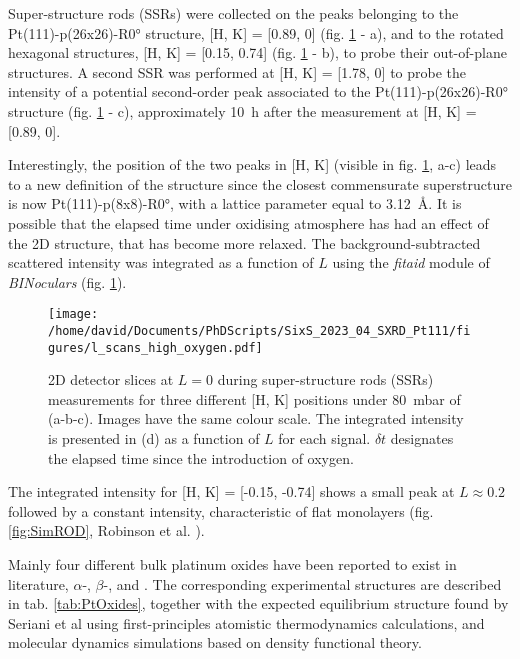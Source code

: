 Super-structure rods (SSRs) were collected on the peaks belonging to the Pt(111)-p(26x26)-R\ang{0} structure, [H, K] = [0.89, 0] (fig. \ref{fig:LScans80} - a), and to the rotated hexagonal structures, [H, K] = [0.15, 0.74] (fig. \ref{fig:LScans80} - b), to probe their out-of-plane structures.
A second SSR was performed at [H, K] = [1.78, 0] to probe the intensity of a potential second-order peak associated to the Pt(111)-p(26x26)-R\ang{0} structure (fig. \ref{fig:LScans80} - c), approximately \qty{10}{\hour} after the measurement at [H, K] = [0.89, 0].

Interestingly, the position of the two peaks in [H, K] (visible in fig. \ref{fig:LScans80}, a-c) leads to a new definition of the structure since the closest commensurate superstructure is now Pt(111)-p(8x8)-R\ang{0}, with a lattice parameter equal to \qty{3.12}{\angstrom}.
It is possible that the elapsed time under oxidising atmosphere has had an effect of the 2D structure, that has become more relaxed.
The background-subtracted scattered intensity was integrated as a function of $L$ using the \textit{fitaid} module of \textit{BINoculars} (fig. \ref{fig:LScans80}).

\begin{figure}[!htb]
    \centering
    \texttt{[image: /home/david/Documents/PhDScripts/SixS\_2023\_04\_SXRD\_Pt111/figures/l\_scans\_high\_oxygen.pdf]}
    \caption{
        2D detector slices at $L=0$ during super-structure rods (SSRs) measurements for three different [H, K] positions under \qty{80}{\milli\bar} of  (a-b-c).
        Images have the same colour scale.
        The integrated intensity is presented in (d) as a function of $L$ for each signal.
        $\delta t$ designates the elapsed time since the introduction of oxygen.
    }
    \label{fig:LScans80}
\end{figure}

The integrated intensity for [H, K] = [-0.15, -0.74] shows a small peak at $L\approx 0.2$ followed by a constant intensity, characteristic of flat monolayers (fig. \ref{fig:SimROD}, Robinson et al. \cite*{Robinson1991}).

Mainly four different bulk platinum oxides have been reported to exist in literature, $\alpha$-, $\beta$-,  and .
The corresponding experimental structures are described in tab. \ref{tab:PtOxides}, together with the expected equilibrium structure found by Seriani et al \parencite*{Seriani2006, Seriani2008} using first-principles atomistic thermodynamics calculations, and molecular dynamics simulations based on density functional theory.

